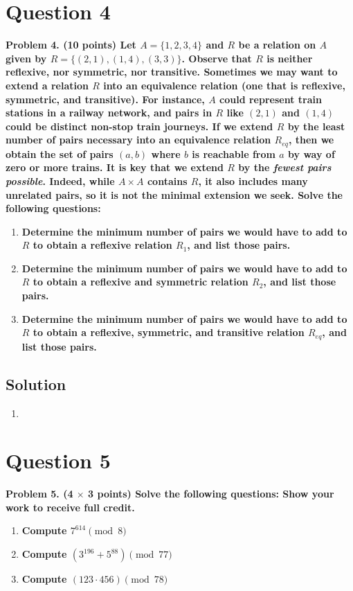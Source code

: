 \documentclass[11pt]{article}
\begin{document}
\clearpage
\section*{Question 4}

    \textbf{Problem 4. (10 points) Let $A = \{1, 2, 3, 4\}$ and $R$ be a relation on $A$ given by $R = \{(2, 1), (1, 4), (3, 3)\}$. Observe that $R$ is neither reflexive, nor symmetric, nor transitive. Sometimes we may want to extend a relation $R$ into an equivalence relation (one that is reflexive, symmetric, and transitive). For instance, $A$ could represent train stations in a railway network, and pairs in $R$ like $(2, 1)$ and $(1, 4)$ could be distinct non-stop train journeys. If we extend $R$ by the least number of pairs necessary into an equivalence relation $R_{eq}$, then we obtain the set of pairs $(a, b)$ where $b$ is reachable from $a$ by way of zero or more trains. It is key that we extend $R$ by the \textit{fewest pairs possible}. Indeed, while $A \times A$ contains $R$, it also includes many unrelated pairs, so it is not the minimal extension we seek. Solve the following questions:}
    \begin{enumerate}[label=(\alph*)]
        \item \textbf{Determine the minimum number of pairs we would have to add to $R$ to obtain a reflexive relation $R_1$, and list those pairs.}
        \item \textbf{Determine the minimum number of pairs we would have to add to $R$ to obtain a reflexive and symmetric relation $R_2$, and list those pairs.}
        \item \textbf{Determine the minimum number of pairs we would have to add to $R$ to obtain a reflexive, symmetric, and transitive relation $R_{eq}$, and list those pairs.}
    \end{enumerate}


    \subsection*{Solution}
    \begin{enumerate}[label=(\alph*)]
        \item 
    \end{enumerate}


\clearpage
\section*{Question 5}

    \textbf{Problem 5. (4 $\times$ 3 points) Solve the following questions: Show your work to receive full credit.}
    \begin{enumerate}[label=(\alph*)]
        \item \textbf{Compute $7^{614} \pmod{8}$}
        \item \textbf{Compute $(3^{196} + 5^{88}) \pmod{77}$}
        \item \textbf{Compute $(123 \cdot 456) \pmod{78}$}
    \end{enumerate}
\end{document}

